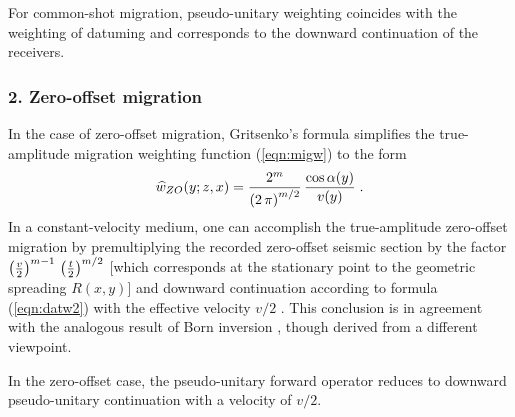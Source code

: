 For common-shot migration, pseudo-unitary weighting coincides with the
weighting of datuming and corresponds to the downward continuation of the
receivers.

\subsubsection{2. Zero-offset migration}
In the case of zero-offset mi\-gra\-tion, Grit\-senko's for\-mu\-la
sim\-pli\-fies the true-amp\-li\-tude mi\-gra\-tion weighting function
(\ref{eqn:migw}) to the form
\begin{equation}
\widehat{w}_{ZO}(y;z,x)  =  {{2^m}\over{\left(2\,\pi\right)^{m/2}}} \,
{{\cos{\alpha(y)}} \over {v(y)}}\;.
\label{eqn:zomigw}
\end{equation}
In a constant-velocity medium, one can accomplish the true-amplitude
zero-offset migration by premultiplying the recorded zero-offset
seismic section by the factor $\left(v \over 2 \right)^{m-1}\,\left(t
\over 2\right)^{m/2}$ [which corresponds at the stationary point to the
geometric spreading $R(x,y)$] and downward continuation according to
formula (\ref{eqn:datw2}) with the effective velocity $v/2$ 
\cite[]{goldin87,GEO56.01.00180026}. This conclusion is in
agreement with the analogous result of Born inversion
\cite[]{GEO50.08.12531265}, though derived from a different viewpoint. 

In the zero-offset case, the pseudo-unitary forward operator reduces to
downward pseudo-unitary continuation with a velocity of $v/2$.

